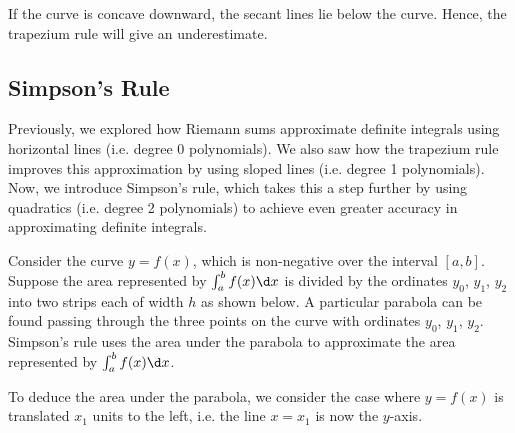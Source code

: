 If the curve is concave downward, the secant lines lie below the curve. Hence, the trapezium rule will give an underestimate.

\begin{figure}[H]
    \centering
    \caption{}
\end{figure}

\subsection{Simpson's Rule}

Previously, we explored how Riemann sums approximate definite integrals using horizontal lines (i.e. degree 0 polynomials). We also saw how the trapezium rule improves this approximation by using sloped lines (i.e. degree 1 polynomials). Now, we introduce Simpson's rule, which takes this a step further by using quadratics (i.e. degree 2 polynomials) to achieve even greater accuracy in approximating definite integrals.

Consider the curve $y = f(x)$, which is non-negative over the interval $[a, b]$. Suppose the area represented by $\int_a^b f(x) \d x$ is divided by the ordinates $y_0$, $y_1$, $y_2$ into two strips each of width $h$ as shown below. A particular parabola can be found passing through the three points on the curve with ordinates $y_0$, $y_1$, $y_2$. Simpson's rule uses the area under the parabola to approximate the area represented by $\int_a^b f(x) \d x$.

To deduce the area under the parabola, we consider the case where $y = f(x)$ is translated $x_1$ units to the left, i.e. the line $x = x_1$ is now the $y$-axis. 


